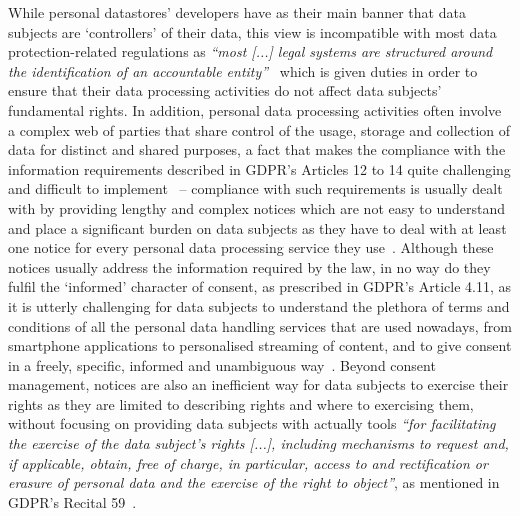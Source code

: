 While personal datastores' developers have as their main banner that data subjects are `controllers' of their data, this view is incompatible with most data protection-related regulations as \textit{``most [...] legal systems are structured around the identification of an accountable entity''}~\citep{chomczyk_penedo_selfsovereign_2021} which is given duties in order to ensure that their data processing activities do not affect data subjects' fundamental rights.
In addition, personal data processing activities often involve a complex web of parties that share control of the usage, storage and collection of data for distinct and shared purposes, a fact that makes the compliance with the information requirements described in GDPR's Articles 12 to 14 quite challenging and difficult to implement~\citep{lovato_more_2023} -- compliance with such requirements is usually dealt with by providing lengthy and complex notices which are not easy to understand and place a significant burden on data subjects as they have to deal with at least one notice for every personal data processing service they use~\citep{terpstra_improving_2019,linden_privacy_2020}.
Although these notices usually address the information required by the law, in no way do they fulfil the `informed' character of consent, as prescribed in GDPR's Article 4.11, as it is utterly challenging for data subjects to understand the plethora of terms and conditions of all the personal data handling services that are used nowadays, from smartphone applications to personalised streaming of content, and to give consent in a freely, specific, informed and unambiguous way~\citep{mohan_analyzing_2019}.
Beyond consent management, notices are also an inefficient way for data subjects to exercise their rights as they are limited to describing rights and where to exercising them, without focusing on providing data subjects with actually tools \textit{``for facilitating the exercise of the data subject’s rights [...], including mechanisms to request and, if applicable, obtain, free of charge, in particular, access to and rectification or erasure of personal data and the exercise of the right to object''}, as mentioned in GDPR's Recital 59~\citeyearpar{noauthor_regulation_2016}.

